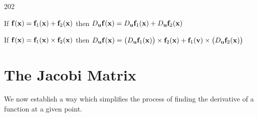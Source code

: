 \begin{prop} \mbox{}
 \begin{dingautolist}{202}
  \item If
\(\mathbf{ f}(\mathbf{ x}) = \mathbf{ f}_1(\mathbf{ x}) + \mathbf{ f}_2(\mathbf{ x})\)
then
\(D_{\mathbf{ u}}\mathbf{ f}(\mathbf{ x})  =  D_{\mathbf{ u}}\mathbf{ f}_1(\mathbf{ x}) + D_{\mathbf{ u}}\mathbf{ f}_2(\mathbf{ x})\)

  \item If
\(\mathbf{ f}(\mathbf{ x}) = \mathbf{ f}_1(\mathbf{ x})\times\mathbf{ f}_2(\mathbf{ x})\)
then
\(D_{\mathbf{ u}}\mathbf{ f}(\mathbf{ x}) =  \left(D_{\mathbf{ u}}\mathbf{ f}_1(\mathbf{ x})\right)\times\mathbf{ f}_2(\mathbf{ x}) + \mathbf{ f}_1(\mathbf{ v})\times\left(D_{\mathbf{ u}}\mathbf{ f}_2(\mathbf{ x}) \right)\)

 \end{dingautolist}

\end{prop}



\section{The Jacobi Matrix}
We now establish a way which simplifies the process of finding the
derivative of a function at a given point.

